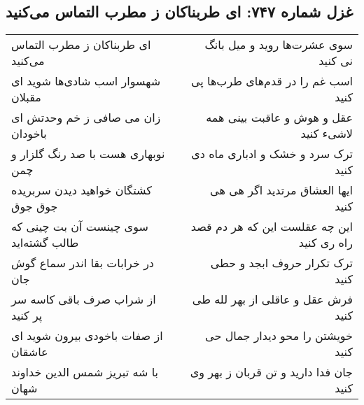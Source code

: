 \begin{center}
\section*{غزل شماره ۷۴۷: ای طربناکان ز مطرب التماس می‌کنید}
\label{sec:0747}
\begin{longtable}{l p{0.5cm} r}
ای طربناکان ز مطرب التماس می‌کنید
&&
سوی عشرت‌ها روید و میل بانگ نی کنید
\\
شهسوار اسب شادی‌ها شوید ای مقبلان
&&
اسب غم را در قدم‌های طرب‌ها پی کنید
\\
زان می صافی ز خم وحدتش ای باخودان
&&
عقل و هوش و عاقبت بینی همه لاشیء کنید
\\
نوبهاری هست با صد رنگ گلزار و چمن
&&
ترک سرد و خشک و ادباری ماه دی کنید
\\
کشتگان خواهید دیدن سربریده جوق جوق
&&
ایها العشاق مرتدید اگر هی هی کنید
\\
سوی چینست آن بت چینی که طالب گشته‌اید
&&
این چه عقلست این که هر دم قصد راه ری کنید
\\
در خرابات بقا اندر سماع گوش جان
&&
ترک تکرار حروف ابجد و حطی کنید
\\
از شراب صرف باقی کاسه سر پر کنید
&&
فرش عقل و عاقلی از بهر لله طی کنید
\\
از صفات باخودی بیرون شوید ای عاشقان
&&
خویشتن را محو دیدار جمال حی کنید
\\
با شه تبریز شمس الدین خداوند شهان
&&
جان فدا دارید و تن قربان ز بهر وی کنید
\\
\end{longtable}
\end{center}
